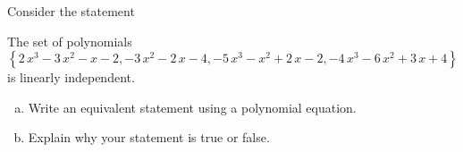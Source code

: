 
\begin{exerciseStatement}


Consider the statement 
\begin{center}\begin{minipage}{0.8\textwidth}
 The set of polynomials \( \left\{ 2 \, x^{3} - 3 \, x^{2} - x - 2 , -3 \, x^{2} - 2 \, x - 4 , -5 \, x^{3} - x^{2} + 2 \, x - 2 , -4 \, x^{3} - 6 \, x^{2} + 3 \, x + 4 \right\} \) is linearly independent.
\end{minipage}\end{center}
    


\begin{enumerate}[(a)]
\item  Write an equivalent statement using a polynomial equation.
\item  Explain why your statement is true or false.
\end{enumerate}
    
\end{exerciseStatement}
    
